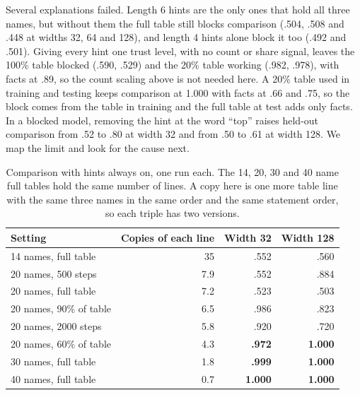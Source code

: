 \documentclass[11pt]{article}
\begin{document}
Several explanations failed. Length 6 hints are the only ones that hold all three names, but without them the full table still blocks comparison (.504, .508 and .448 at widths 32, 64 and 128), and length 4 hints alone block it too (.492 and .501). Giving every hint one trust level, with no count or share signal, leaves the 100\% table blocked (.590, .529) and the 20\% table working (.982, .978), with facts at .89, so the count scaling above is not needed here. A 20\% table used in training and testing keeps comparison at 1.000 with facts at .66 and .75, so the block comes from the table in training and the full table at test adds only facts. In a blocked model, removing the hint at the word ``top'' raises held-out comparison from .52 to .80 at width 32 and from .50 to .61 at width 128. We map the limit and look for the cause next.

\begin{table}[h]\centering\small
\begin{tabular}{lrrr}\toprule
Setting & Copies of each line & Width 32 & Width 128\\\midrule
14 names, full table & 35 & .552 & .560\\
20 names, 500 steps & 7.9 & .552 & .884\\
20 names, full table & 7.2 & .523 & .503\\
20 names, 90\% of table & 6.5 & .986 & .823\\
20 names, 2000 steps & 5.8 & .920 & .720\\
20 names, 60\% of table & 4.3 & \textbf{.972} & \textbf{1.000}\\
30 names, full table & 1.8 & \textbf{.999} & \textbf{1.000}\\
40 names, full table & 0.7 & \textbf{1.000} & \textbf{1.000}\\\bottomrule
\end{tabular}
\caption{Comparison with hints always on, one run each. The 14, 20, 30 and 40 name full tables hold the same number of lines. A copy here is one more table line with the same three names in the same order and the same statement order, so each triple has two versions.}\label{tab:copies}
\end{table}
\end{document}
